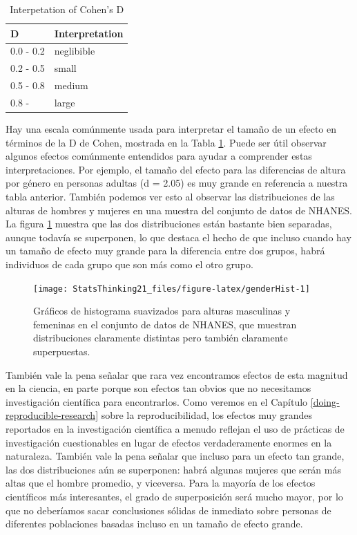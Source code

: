 \documentclass[
  12pt,
]{book}
\begin{document}
\begin{table}

\caption{\label{tab:dInterp}Interpetation of Cohen's D}
\centering
\begin{tabular}[t]{l|l}
\hline
D & Interpretation\\
\hline
0.0 - 0.2 & neglibible\\
\hline
0.2 - 0.5 & small\\
\hline
0.5 - 0.8 & medium\\
\hline
0.8 - & large\\
\hline
\end{tabular}
\end{table}

Hay una escala comúnmente usada para interpretar el tamaño de un efecto en términos de la D de Cohen, mostrada en la Tabla \ref{tab:dInterp}. Puede ser útil observar algunos efectos comúnmente entendidos para ayudar a comprender estas interpretaciones. Por ejemplo, el tamaño del efecto para las diferencias de altura por género en personas adultas (d = 2.05) es muy grande en referencia a nuestra tabla anterior. También podemos ver esto al observar las distribuciones de las alturas de hombres y mujeres en una muestra del conjunto de datos de NHANES. La figura \ref{fig:genderHist} muestra que las dos distribuciones están bastante bien separadas, aunque todavía se superponen, lo que destaca el hecho de que incluso cuando hay un tamaño de efecto muy grande para la diferencia entre dos grupos, habrá individuos de cada grupo que son más como el otro grupo.

\begin{figure}
\texttt{[image: StatsThinking21\_files/figure-latex/genderHist-1]} \caption{Gráficos de histograma suavizados para alturas masculinas y femeninas en el conjunto de datos de NHANES, que muestran distribuciones claramente distintas pero también claramente superpuestas.}\label{fig:genderHist}
\end{figure}

También vale la pena señalar que rara vez encontramos efectos de esta magnitud en la ciencia, en parte porque son efectos tan obvios que no necesitamos investigación científica para encontrarlos. Como veremos en el Capítulo \ref{doing-reproducible-research} sobre la reproducibilidad, los efectos muy grandes reportados en la investigación científica a menudo reflejan el uso de prácticas de investigación cuestionables en lugar de efectos verdaderamente enormes en la naturaleza. También vale la pena señalar que incluso para un efecto tan grande, las dos distribuciones aún se superponen: habrá algunas mujeres que serán más altas que el hombre promedio, y viceversa. Para la mayoría de los efectos científicos más interesantes, el grado de superposición será mucho mayor, por lo que no deberíamos sacar conclusiones sólidas de inmediato sobre personas de diferentes poblaciones basadas incluso en un tamaño de efecto grande.
\end{document}
